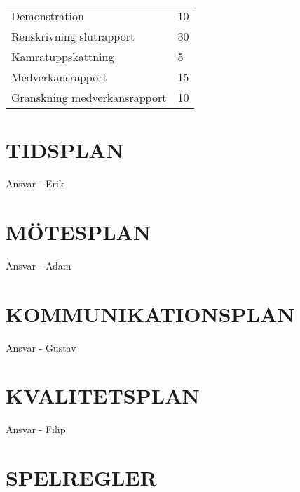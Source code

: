 \documentclass[a4paper]{article}
\begin{document}
\begin{table}[htb]
\begin{tabular}{|l|l|}
Demonstration                                             & 10               \\
Renskrivning slutrapport                                  & 30               \\
Kamratuppskattning                                        & 5                \\
Medverkansrapport                                         & 15               \\
Granskning medverkansrapport                              & 10               \\ \hline
\end{tabular}
\end{table}

\section{TIDSPLAN}
\label{sec:tidsplan}

Ansvar - Erik

\section{MÖTESPLAN}
\label{sec:mötesplan}

Ansvar - Adam

\section{KOMMUNIKATIONSPLAN}
\label{sec:komm}

Ansvar - Gustav

\section{KVALITETSPLAN}
\label{sec:kval}

Ansvar - Filip

\section{SPELREGLER}
\label{sec:spelregler}
\end{document}
